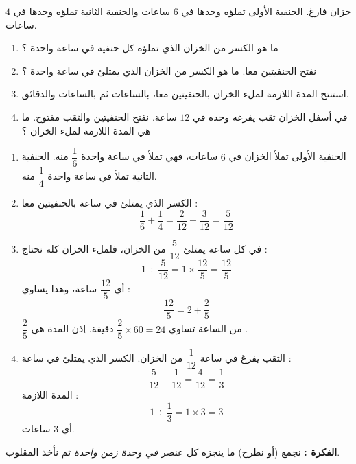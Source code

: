 \documentclass[12pt,a4paper]{article}
\begin{document}
\begin{corr}[title={الحنفيات}, stars=3, source={Axiomaths}]
خزان فارغ. الحنفية الأولى تملؤه وحدها في $6$ ساعات والحنفية الثانية تملؤه وحدها في $4$ ساعات.
\begin{enumerate}
  \item ما هو الكسر من الخزان الذي تملؤه كل حنفية في ساعة واحدة ؟
  \item نفتح الحنفيتين معا. ما هو الكسر من الخزان الذي يمتلئ في ساعة واحدة ؟
  \item استنتج المدة اللازمة لملء الخزان بالحنفيتين معا، بالساعات ثم بالساعات والدقائق.
  \item في أسفل الخزان ثقب يفرغه وحده في $12$ ساعة. نفتح الحنفيتين والثقب مفتوح. ما هي المدة اللازمة لملء الخزان ؟
\end{enumerate}
\axsol
\begin{enumerate}[itemsep=14pt]
  \item الحنفية الأولى تملأ الخزان في $6$ ساعات، فهي تملأ في ساعة واحدة $\dfrac{1}{6}$ منه.
  الحنفية الثانية تملأ في ساعة واحدة $\dfrac{1}{4}$ منه.
  \item الكسر الذي يمتلئ في ساعة بالحنفيتين معا :
  \[\dfrac{1}{6}+\dfrac{1}{4}=\dfrac{2}{12}+\dfrac{3}{12}=\dfrac{5}{12}\]
  \item في كل ساعة يمتلئ $\dfrac{5}{12}$ من الخزان، فلملء الخزان كله نحتاج :
  \[1\div\dfrac{5}{12}=1\times\dfrac{12}{5}=\dfrac{12}{5}\]
  أي $\dfrac{12}{5}$ ساعة، وهذا يساوي :
  \[\dfrac{12}{5}=2+\dfrac{2}{5}\]
  $\dfrac{2}{5}$ من الساعة تساوي $\dfrac{2}{5}\times60=24$ دقيقة. إذن المدة هي .
  \item الثقب يفرغ في ساعة $\dfrac{1}{12}$ من الخزان. الكسر الذي يمتلئ في ساعة :
  \[\dfrac{5}{12}-\dfrac{1}{12}=\dfrac{4}{12}=\dfrac{1}{3}\]
  المدة اللازمة :
  \[1\div\dfrac{1}{3}=1\times3=3\]
  أي $3$ ساعات.
\end{enumerate}
\textbf{الفكرة :} نجمع (أو نطرح) ما ينجزه كل عنصر \emph{في وحدة زمن واحدة} ثم نأخذ المقلوب.
\end{corr}
\end{document}
